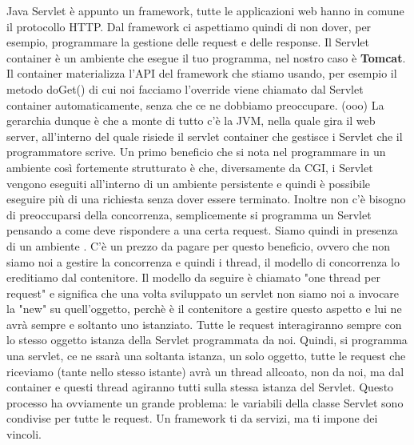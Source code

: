 \newline
Java Servlet è appunto un framework, tutte le applicazioni web hanno in comune il protocollo HTTP. Dal framework ci aspettiamo quindi di non dover, per esempio, programmare la gestione delle request e delle response.\newline
\newline
Il Servlet container è un ambiente che esegue il tuo programma, nel nostro caso è \textbf{Tomcat}. Il container materializza l'API del framework che stiamo usando, per esempio il metodo doGet() di cui noi facciamo l'override viene chiamato dal Servlet container automaticamente, senza che ce ne dobbiamo preoccupare.\newline
\newline
(ooo) La gerarchia dunque è che a monte di tutto c'è la JVM, nella quale gira il web server, all'interno del quale risiede il servlet container che gestisce i Servlet che il programmatore scrive.\newline
\newline
Un primo beneficio che si nota nel programmare in un ambiente così fortemente strutturato è che, diversamente da CGI, i Servlet vengono eseguiti all'interno di un ambiente persistente e quindi è possibile eseguire più di una richiesta senza dover essere terminato.\newline
Inoltre non c'è bisogno di preoccuparsi della concorrenza, semplicemente si programma un Servlet pensando a come deve rispondere a una certa request. Siamo quindi in presenza di un ambiente . C'è un prezzo da pagare per questo beneficio, ovvero che non siamo noi a gestire la concorrenza e quindi i thread, il modello di concorrenza lo ereditiamo dal contenitore. Il modello da seguire è chiamato "one thread per request" e significa che una volta sviluppato un servlet non siamo noi a invocare la "new" su quell'oggetto, perchè è il contenitore a gestire questo aspetto e lui ne avrà sempre e soltanto uno istanziato. Tutte le request interagiranno sempre con lo stesso oggetto istanza della Servlet programmata da noi. Quindi, si programma una servlet, ce ne ssarà una soltanta istanza, un solo oggetto, tutte le request che riceviamo (tante nello stesso istante) avrà un thread allcoato, non da noi, ma dal container e questi thread agiranno tutti sulla stessa istanza del Servlet. Questo processo ha ovviamente un grande problema: le variabili della classe Servlet sono condivise per tutte le request.\newline
Un framework ti da servizi, ma ti impone dei vincoli.\newline
